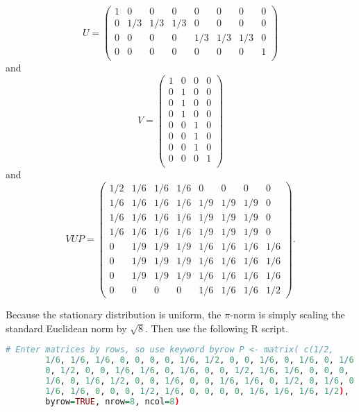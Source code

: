 \documentclass[12pt]{article}
\begin{document}
\begin{solution}
    \[
        U =
        \begin{pmatrix}
            1 & 0 & 0 & 0 & 0 & 0 & 0 & 0 \\
            0 & 1/3 & 1/3 & 1/3 & 0 & 0 & 0 & 0 \\
            0 & 0 & 0 & 0 & 1/3 & 1/3 & 1/3 & 0 \\
            0 & 0 & 0 & 0 & 0 & 0 & 0 & 1\\
        \end{pmatrix}
    \] and
    \[
        V =
        \begin{pmatrix}
            1 & 0 & 0 & 0 \\
            0 & 1 & 0 & 0 \\
            0 & 1 & 0 & 0 \\
            0 & 1 & 0 & 0 \\
            0 & 0 & 1 & 0 \\
            0 & 0 & 1 & 0 \\
            0 & 0 & 1 & 0 \\
            0 & 0 & 0 & 1 \\
        \end{pmatrix}
    \] and
    \[
        VUP =
        \begin{pmatrix}
            1/2 & 1/6 & 1/6 & 1/6 & 0 & 0 & 0 & 0\\
            1/6 & 1/6 & 1/6 & 1/6 & 1/9 & 1/9 & 1/9 & 0\\
            1/6 & 1/6 & 1/6 & 1/6 & 1/9 & 1/9 & 1/9 & 0\\
            1/6 & 1/6 & 1/6 & 1/6 & 1/9 & 1/9 & 1/9 & 0\\
            0 & 1/9 & 1/9 & 1/9 & 1/6 & 1/6 & 1/6 & 1/6\\
            0 & 1/9 & 1/9 & 1/9 & 1/6 & 1/6 & 1/6 & 1/6\\
            0 & 1/9 & 1/9 & 1/9 & 1/6 & 1/6 & 1/6 & 1/6\\
            0 & 0 & 0 & 0 & 1/6 & 1/6 & 1/6 & 1/2
        \end{pmatrix}
        .
    \]

    Because the stationary distribution is uniform, the \( \pi \)-norm
    is simply scaling the standard Euclidean norm by \( \sqrt{8} \).
    Then use the following R script.

    \begin{lstlisting}[language=R]
        # Enter matrices by rows, so use keyword byrow P <- matrix( c(1/2,
        1/6, 1/6, 1/6, 0, 0, 0, 0, 1/6, 1/2, 0, 0, 1/6, 0, 1/6, 0, 1/6,
        0, 1/2, 0, 0, 1/6, 1/6, 0, 1/6, 0, 0, 1/2, 1/6, 1/6, 0, 0, 0,
        1/6, 0, 1/6, 1/2, 0, 0, 1/6, 0, 0, 1/6, 1/6, 0, 1/2, 0, 1/6, 0,
        1/6, 1/6, 0, 0, 0, 1/2, 1/6, 0, 0, 0, 0, 1/6, 1/6, 1/6, 1/2),
        byrow=TRUE, nrow=8, ncol=8)


\end{lstlisting}
\end{solution}
\end{document}
